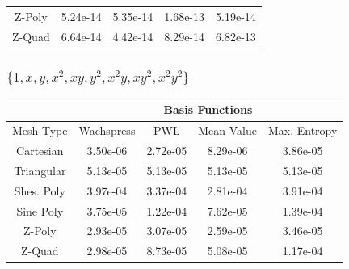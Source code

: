 \documentclass[compress,10pt]{beamer}
\begin{document}
\begin{frame}[t]
{\begin{table}
\begin{center}
\begin{tabular}{|c|c|c|c|c|}
Z-Poly&5.24e-14&5.35e-14&1.68e-13&5.19e-14\\
Z-Quad&6.64e-14&4.42e-14&8.29e-14&6.82e-13\\
\hline
\end{tabular}
\end{center}
\end{table}
}
{
\frametitle{$\{  1,x,y,x^2,xy,y^2,x^2 y, x y^2, x^2 y^2 \}$}
\centering
\begin{table}
\begin{center}
\def\arraystretch{1.6}
\begin{tabular}{|c|c|c|c|c|}
\hline
& \multicolumn{4}{c}{Basis Functions}\vline\\
\hline
Mesh Type & Wachspress & PWL& Mean Value& Max. Entropy \\
\hline
Cartesian&3.50e-06&2.72e-05&8.29e-06&3.86e-05\\
Triangular&5.13e-05&5.13e-05&5.13e-05&5.13e-05\\
Shes. Poly&3.97e-04&3.37e-04&2.81e-04&3.91e-04\\
Sine Poly&3.75e-05&1.22e-04&7.62e-05&1.39e-04\\
Z-Poly&2.93e-05&3.07e-05&2.59e-05&3.46e-05\\
Z-Quad&2.98e-05&8.73e-05&5.08e-05&1.17e-04\\
\hline
\end{tabular}
\end{center}
\end{table}
}
\end{frame}
\end{document}
